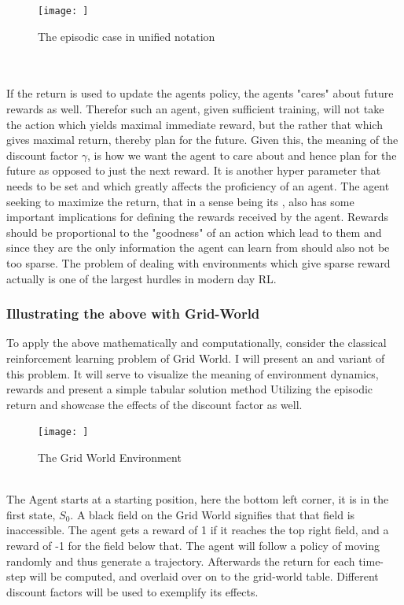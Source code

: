 \begin{figure}[h!]
    \centering
    \texttt{[image: ]}
    \caption{The episodic case in unified notation}
    \label{fig:unified_continuous_episodic_return}
\end{figure}
\\
\\ If the return is used to update the agents policy, the agents "cares" about future rewards as well. Therefor such an agent, given sufficient training, will not take the action which yields maximal immediate reward, but the rather that which gives maximal return, thereby plan for the future. Given this, the meaning of the discount factor $\gamma$, is how we want the agent to care about and hence plan for the future as opposed to just the next reward. It is another hyper parameter that needs to be set and which greatly affects the proficiency of an agent. The agent seeking to maximize the return, that in a sense being its , also has some important implications for defining the rewards received by the agent. Rewards should be proportional to the "goodness" of an action which lead to them and since they are the only information the agent can learn from should also not be too sparse.  The problem of dealing with environments which give sparse reward actually is one of the largest hurdles in modern day RL.

\subsubsection{Illustrating the above with Grid-World}\label{subsubsec:grid_world}

To apply the above mathematically and computationally, consider the classical reinforcement learning problem of Grid World. I will present an  and  variant of this problem. It will serve to visualize the meaning of environment dynamics, rewards and present a simple tabular solution method Utilizing the episodic return and showcase the effects of the discount factor as well.

\begin{figure}[h!]
    \centering
    \texttt{[image: ]}
    \caption{The Grid World Environment}
    \label{fig:grid_world}
\end{figure}
\noindent
\\ The Agent starts at a starting position, here the bottom left corner, it is in the first state, $S_0$. A black field on the Grid World signifies that that field is inaccessible. The agent gets a reward of 1 if it reaches the top right field, and a reward of -1 for the field below that. The agent will follow a policy of moving randomly and thus generate a trajectory. Afterwards the return for each time-step will be computed, and overlaid over on to the grid-world table. Different discount factors will be used to exemplify its effects. 

